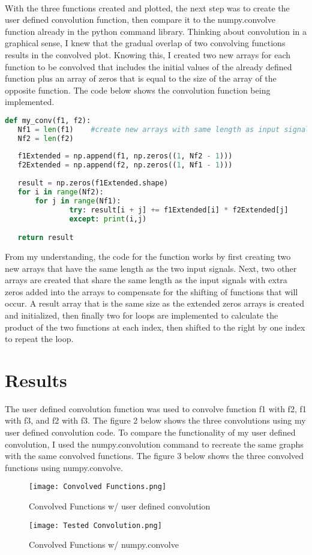 \documentclass[12pt]{report}
\begin{document}
\\
\hspace{\parindent}With the three functions created and plotted, the next step was to create the user defined convolution function, then compare it to the numpy.convolve function already in the python command library. Thinking about convolution in a graphical sense, I knew that the gradual overlap of two convolving functions results in the convolved plot. Knowing this, I created two new arrays for each function to be convolved that includes the initial values of the already defined function plus an array of zeros that is equal to the size of the array of the opposite function. The code below shows the convolution function being implemented.
\begin{lstlisting}[language=Python, caption=Convolution Function]
def my_conv(f1, f2):
   Nf1 = len(f1)    #create new arrays with same length as input signals
   Nf2 = len(f2)
   
   f1Extended = np.append(f1, np.zeros((1, Nf2 - 1)))                                                  
   f2Extended = np.append(f2, np.zeros((1, Nf1 - 1))) 
   
   result = np.zeros(f1Extended.shape)
   for i in range(Nf2):     
       for j in range(Nf1): 
               try: result[i + j] += f1Extended[i] * f2Extended[j]
               except: print(i,j)

   return result
\end{lstlisting}
\hspace{\parindent}From my understanding, the code for the function works by first creating two new arrays that have the same length as the two input signals. Next, two other arrays are created that share the same length as the input signals with extra zeros added into the arrays to compensate for the shifting of functions that will occur. A result array that is the same size as the extended zeros arrays is created and initialized, then finally two for loops are implemented to calculate the product of the two functions at each index, then shifted to the right by one index to repeat the loop.
\section{Results}
\hspace{\parindent}The user defined convolution function was used to convolve function f1 with f2, f1 with f3, and f2 with f3. The figure 2 below shows the three convolutions using my user defined convolution code. To compare the functionality of my user defined convolution, I used the numpy.convolution command to recreate the same graphs with the same convolved functions. The figure 3 below shows the three convolved functions using numpy.convolve.
\begin{figure}[h!]
    \centering
    \texttt{[image: Convolved Functions.png]}
    \caption{Convolved Functions w/ user defined convolution}
    \label{Figure x:}
\end{figure}
\begin{figure}[h!]
    \centering
    \texttt{[image: Tested Convolution.png]}
    \caption{Convolved Functions w/ numpy.convolve}
    \label{Figure x:}
\end{figure}
\end{document}
